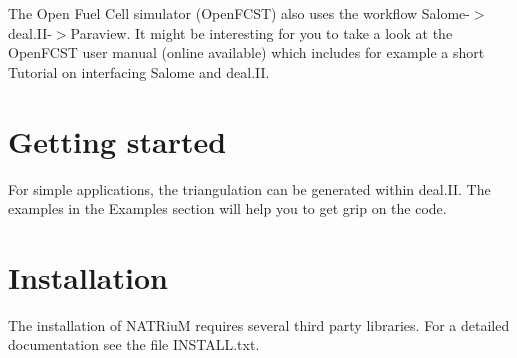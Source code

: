 The Open Fuel Cell simulator (OpenFCST) also uses the workflow Salome-\/$>$deal.II-\/$>$Paraview. It might be interesting for you to take a look at the OpenFCST user manual (online available) which includes for example a short Tutorial on interfacing Salome and deal.II.\hypertarget{index_start_sec}{}\section{Getting started}\label{index_start_sec}
For simple applications, the triangulation can be generated within deal.II. The examples in the Examples section will help you to get grip on the code.\hypertarget{index_install_sec}{}\section{Installation}\label{index_install_sec}
The installation of NATRiuM requires several third party libraries. For a detailed documentation see the file INSTALL.txt. 